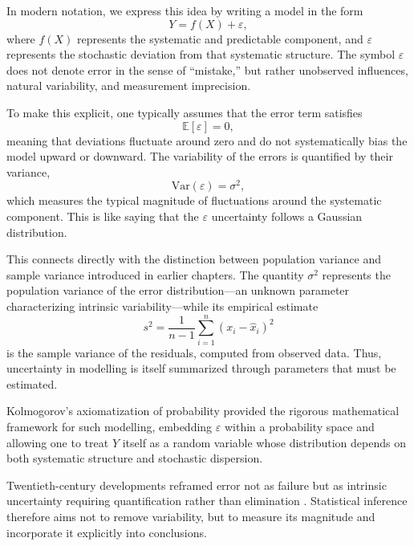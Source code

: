 \medskip

In modern notation, we express this idea by writing a model in the form
\[
    Y = f(X) + \varepsilon,
\]
where \(f(X)\) represents the systematic and predictable component, and \(\varepsilon\) represents the stochastic deviation from that systematic structure. The symbol \(\varepsilon\) does not denote error in the sense of “mistake,” but rather unobserved influences, natural variability, and measurement imprecision.

\medskip

To make this explicit, one typically assumes that the error term satisfies
\[
    \mathbb{E}[\varepsilon] = 0,
\]
meaning that deviations fluctuate around zero and do not systematically bias the model upward or downward. The variability of the errors is quantified by their variance,
\[
    \mathrm{Var}(\varepsilon) = \sigma^2,
\]
which measures the typical magnitude of fluctuations around the systematic component. This is like saying that the \(\varepsilon\) uncertainty follows a Gaussian distribution.

\medskip

This connects directly with the distinction between population variance and sample variance introduced in earlier chapters. The quantity \(\sigma^2\) represents the population variance of the error distribution—an unknown parameter characterizing intrinsic variability—while its empirical estimate
\[
    s^2 = \frac{1}{n-1}\sum_{i=1}^{n}(x_i-\hat{x}_i)^2
\]
is the sample variance of the residuals, computed from observed data. Thus, uncertainty in modelling is itself summarized through parameters that must be estimated.

\medskip

Kolmogorov’s axiomatization of probability \cite{kolmogorov_1933_grundbegriffe} provided the rigorous mathematical framework for such modelling, embedding \(\varepsilon\) within a probability space and allowing one to treat \(Y\) itself as a random variable whose distribution depends on both systematic structure and stochastic dispersion.

\medskip

Twentieth-century developments reframed error not as failure but as intrinsic uncertainty requiring quantification rather than elimination \cite{cox_2006_principles,mayo_1996_error}. Statistical inference therefore aims not to remove variability, but to measure its magnitude and incorporate it explicitly into conclusions.

\medskip

